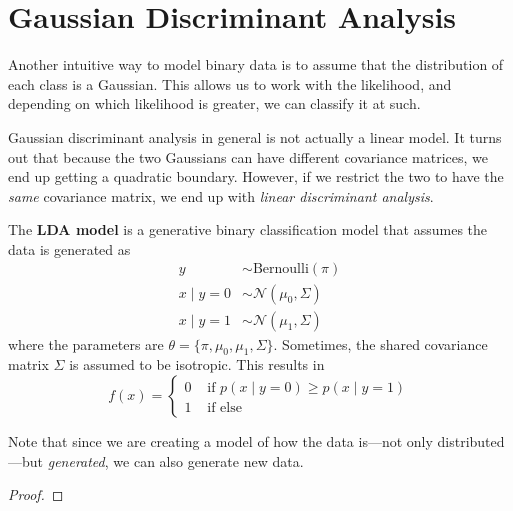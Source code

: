 \section{Gaussian Discriminant Analysis} 

  Another intuitive way to model binary data is to assume that the distribution of each class is a Gaussian. This allows us to work with the likelihood, and depending on which likelihood is greater, we can classify it at such. 

  Gaussian discriminant analysis in general is not actually a linear model. It turns out that because the two Gaussians can have different covariance matrices, we end up getting a quadratic boundary. However, if we restrict the two to have the \textit{same} covariance matrix, we end up with \textit{linear discriminant analysis}. 

  \begin{definition} 
    The \textbf{LDA model} is a generative binary classification model that assumes the data is generated as 
    \begin{align} 
      y & \sim \text{Bernoulli}(\pi) \\
      x \mid y = 0 & \sim \mathcal{N} (\mu_0, \Sigma) \\
      x \mid y = 1 & \sim \mathcal{N} (\mu_1, \Sigma)
    \end{align}
    where the parameters are $\theta = \{\pi, \mu_0, \mu_1, \Sigma\}$. Sometimes, the shared covariance matrix $\Sigma$ is assumed to be isotropic. This results in 
    \begin{equation}
      f(x) = \begin{cases} 
        0 & \text{ if } p(x \mid y = 0) \geq p(x \mid y = 1) \\  
        1 & \text{ if else}
      \end{cases}
    \end{equation}
  \end{definition} 

  Note that since we are creating a model of how the data is---not only distributed---but \textit{generated}, we can also generate new data.  

  \begin{theorem}
    
  \end{theorem}
  \begin{proof}
    
  \end{proof}

